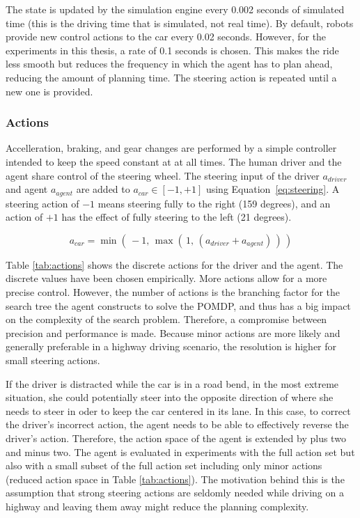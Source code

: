 The state is updated by the simulation engine every 0.002 seconds of simulated time (this is the driving time that is simulated, not real time). By default, robots provide new control actions to the car every 0.02 seconds. However, for the experiments in this thesis, a rate of 0.1 seconds is chosen. This makes the ride less smooth but reduces the frequency in which the agent has to plan ahead, reducing the amount of planning time. The steering action is repeated until a new one is provided.

\subsubsection{Actions}
\label{sec:actions}

Accelleration, braking, and gear changes are performed by a simple controller intended to keep the speed constant at at all times. The human driver and the agent share control of the steering wheel. The steering input of the driver $a_{driver}$ and agent $a_{agent}$ are added to $a_{car} \in [-1, +1]$ using Equation~\ref{eq:steering}. A steering action of $-1$ means steering fully to the right (159 degrees), and an action of $+1$ has the effect of fully steering to the left (21 degrees). 

\begin{equation}
    a_{car} = \min(\, -1, \, \max(\, 1, \, (a_{driver} + a_{agent})\,)\,)
    \label{eq:steering}
\end{equation}

Table \ref{tab:actions} shows the discrete actions for the driver and the agent. The discrete values have been chosen empirically. More actions allow for a more precise control. However, the number of actions is the branching factor for the search tree the agent constructs to solve the POMDP, and thus has a big impact on the complexity of the search problem. Therefore, a compromise between precision and performance is made. Because minor actions are more likely and generally preferable in a highway driving scenario, the resolution is higher for small steering actions.



If the driver is distracted while the car is in a road bend, in the most extreme situation, she could potentially steer into the opposite direction of where she needs to steer in oder to keep the car centered in its lane. In this case, to correct the driver's incorrect action, the agent needs to be able to effectively reverse the driver's action. Therefore, the action space of the agent is extended by plus two and minus two. The agent is evaluated in experiments with the full action set but also with a small subset of the full action set including only minor actions (reduced action space in Table \ref{tab:actions}). The motivation behind this is the assumption that strong steering actions are seldomly needed while driving on a highway and leaving them away might reduce the planning complexity.

